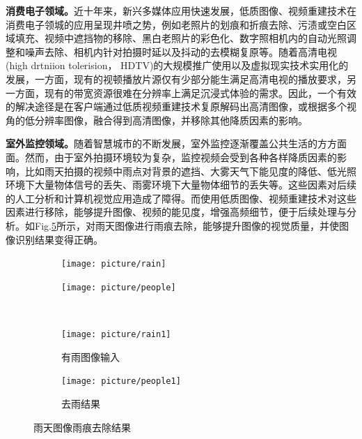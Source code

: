 \documentclass[letterpaper,10pt]{article}
\begin{document}
	\textbf{消费电子领域。}近十年来，新兴多媒体应用快速发展，低质图像、视频重建技术在消费电子领城的应用呈现井喷之势，例如老照片的划痕和折痕去除、污渍或空白区域填充、视频中遮挡物的移除、黑白老照片的彩色化、数字照相机内的自动光照调整和噪声去除、相机内针对拍摄时延以及抖动的去模糊复原等。随着高清电视(high drtniion tolerision， HDTV)的大规模推广使用以及虚拟现实技术实用化的发展，一方面，现有的视顿播放片源仅有少部分能生满足高清电视的播放要求，另一方面，现有的带宽资源很难在分辨率上满足沉浸式体验的需求。因此，一个有效的解决途径是在客户端通过低质视频重建技术复原解码出高清图像，或根据多个视角的低分辨率图像，融合得到高清图像，并移除其他降质因素的影响。
	
	\textbf{室外监控领域。}随着智慧城市的不断发展，室外监控逐渐覆盖公共生活的方方面面。然而，由于室外拍摄环境较为复杂，监控视频会受到各种各样降质因素的影响，比如雨天拍摄的视频中雨点对背景的遮挡、大雾天气下能见度的降低、低光照环境下大量物体信号的丢失、雨雾环境下大量物体细节的丢失等。这些因素对后续的人工分析和计算机视觉应用造成了障得。而使用低质图像、视频重建技术对这些因素进行移除，能够提升图像、视频的能见度，增强高频细节，便于后续处理与分析。如Fig.\ref{fig: Rainy image marks}所示，对雨天图像进行雨痕去除，能够提升图像的视觉质量，并使图像识别结果变得正确。
	
		\begin{figure}[htbp] 
		\centering 
		
		\begin{subfigure}{0.4\textwidth}
			\texttt{[image: picture/rain]}
			\captionsetup{font=scriptsize}
			\label{fig:rain}
		\end{subfigure}
		\begin{subfigure}{0.4\textwidth}
			\texttt{[image: picture/people]}
			\captionsetup{font=scriptsize}
			\label{fig:people}
		\end{subfigure}\\
		\begin{subfigure}{0.4\textwidth}
			\texttt{[image: picture/rain1]}
			\captionsetup{font=scriptsize}
			\caption{有雨图像输入}
			\label{fig:rain1}	
		\end{subfigure}
		\begin{subfigure}{0.4\textwidth}
			\texttt{[image: picture/people1]}
			\captionsetup{font=scriptsize}
			\caption{去雨结果}
			\label{fig:people1}
		\end{subfigure}
		\captionsetup{font=scriptsize}
		\caption{
			\label{fig: Rainy image marks}
			雨天图像雨痕去除结果 \cite{yang2017deep}
		}
	    \end{figure}
	
\end{document}
